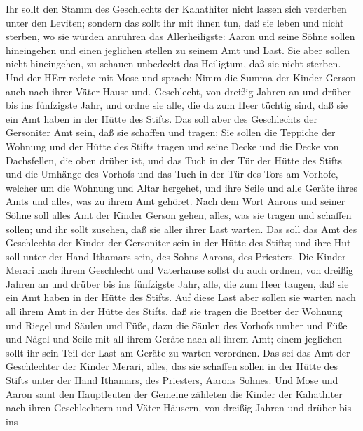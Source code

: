  Ihr sollt den Stamm des Geschlechts der Kahathiter nicht
lassen sich verderben unter den Leviten;  sondern das sollt
ihr mit ihnen tun, daß sie leben und nicht sterben, wo sie würden
anrühren das Allerheiligste: Aaron und seine Söhne sollen hineingehen
und einen jeglichen stellen zu seinem Amt und Last.  Sie
aber sollen nicht hineingehen, zu schauen unbedeckt das Heiligtum, daß
sie nicht sterben.  Und der HErr redete mit Mose und
sprach:  Nimm die Summa der Kinder Gerson auch nach ihrer
Väter Hause und. Geschlecht,  von dreißig Jahren an und
drüber bis ins fünfzigste Jahr, und ordne sie alle, die da zum Heer
tüchtig sind, daß sie ein Amt haben in der Hütte des Stifts.
 Das soll aber des Geschlechts der Gersoniter Amt sein, daß
sie schaffen und tragen:  Sie sollen die Teppiche der
Wohnung und der Hütte des Stifts tragen und seine Decke und die Decke
von Dachsfellen, die oben drüber ist, und das Tuch in der Tür der Hütte
des Stifts  und die Umhänge des Vorhofs und das Tuch in der
Tür des Tors am Vorhofe, welcher um die Wohnung und Altar hergehet, und
ihre Seile und alle Geräte ihres Amts und alles, was zu ihrem Amt
gehöret.  Nach dem Wort Aarons und seiner Söhne soll alles
Amt der Kinder Gerson gehen, alles, was sie tragen und schaffen sollen;
und ihr sollt zusehen, daß sie aller ihrer Last warten. 
Das soll das Amt des Geschlechts der Kinder der Gersoniter sein in der
Hütte des Stifts; und ihre Hut soll unter der Hand Ithamars sein, des
Sohns Aarons, des Priesters.  Die Kinder Merari nach ihrem
Geschlecht und Vaterhause sollst du auch ordnen,  von
dreißig Jahren an und drüber bis ins fünfzigste Jahr, alle, die zum Heer
taugen, daß sie ein Amt haben in der Hütte des Stifts.  Auf
diese Last aber sollen sie warten nach all ihrem Amt in der Hütte des
Stifts, daß sie tragen die Bretter der Wohnung und Riegel und Säulen und
Füße,  dazu die Säulen des Vorhofs umher und Füße und Nägel
und Seile mit all ihrem Geräte nach all ihrem Amt; einem jeglichen sollt
ihr sein Teil der Last am Geräte zu warten verordnen.  Das
sei das Amt der Geschlechter der Kinder Merari, alles, das sie schaffen
sollen in der Hütte des Stifts unter der Hand Ithamars, des Priesters,
Aarons Sohnes.  Und Mose und Aaron samt den Hauptleuten der
Gemeine zähleten die Kinder der Kahathiter nach ihren Geschlechtern und
Väter Häusern,  von dreißig Jahren und drüber bis ins
